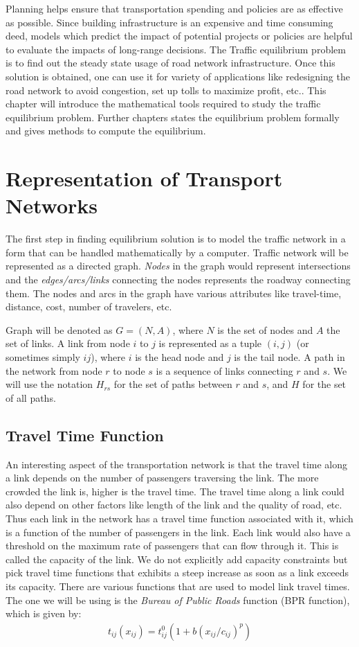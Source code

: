 Planning helps ensure that transportation spending and policies
are as effective as possible. Since building infrastructure
is an expensive and time consuming deed, models which predict the impact of potential projects
or policies are helpful to evaluate the impacts of long-range decisions. The Traffic equilibrium problem
is to find out the steady state usage of road network
infrastructure. Once this solution is obtained,
one can use it for variety of applications like redesigning the road network to avoid congestion, set up tolls to maximize profit, etc.. This chapter will introduce the mathematical tools required to study the traffic equilibrium problem. Further chapters states the equilibrium problem formally and gives methods to compute the equilibrium.

\section{Representation of Transport Networks}
The first step in finding equilibrium solution is to model the traffic network in a form that can be handled mathematically by a computer. Traffic network will be represented as a directed graph. \textit{Nodes} in the graph would represent intersections and the \emph{edges/arcs/links} connecting the nodes represents the roadway connecting them. The nodes and arcs in the graph have various attributes like travel-time, distance, cost, number of travelers, etc.

Graph will be denoted as $G=(N,A)$, where $N$ is the set of nodes and $A$ the set of links.	A link from node $i$ to $j$ is represented as a	tuple $(i,j)$ (or sometimes simply $ij$),	where $i$ is the head node and $j$ is the tail node. A path in the network from node $r$ to node $s$	is a sequence of links connecting $r$ and $s$. We will use the notation $H_{rs}$ for the set of paths between $r$ and $s$, and $H$ for the set of all paths.


\subsection{Travel Time Function}
An interesting aspect of the transportation network is that the travel time along a link depends on the number of passengers traversing the link. The more crowded the link is, higher is the travel time. The travel time along a link could also depend on other factors like length of the link and the quality of road, etc. Thus each link in the network has a travel time function associated with it, which is a function of the number of passengers in the link. Each link would also have a threshold on the maximum rate of passengers that can flow through it. This is called the capacity of the link. We do not explicitly add capacity constraints but pick travel time functions that exhibits a steep increase as soon as a link exceeds its capacity. There are	various functions that are used to model link travel times. The one we will be using is the \emph{Bureau of Public Roads} function (BPR function), which is given by:
\begin{align*}
	t_{ij}(x_{ij}) = t^0_{ij}(1 + b(x_{ij}/c_{ij})^{p})
\end{align*}

